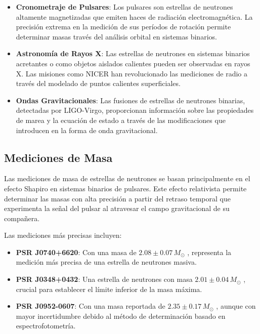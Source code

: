 \begin{itemize}
	\item \textbf{Cronometraje de Pulsares}: Los pulsares son estrellas de neutrones altamente magnetizadas que emiten haces de radiación electromagnética. La precisión extrema en la medición de sus períodos de rotación permite determinar masas través del análisis orbital en sistemas binarios.
	
	\item \textbf{Astronomía de Rayos X}: Las estrellas de neutrones en sistemas binarios acretantes o como objetos aislados calientes pueden ser observadas en rayos X. Las misiones como NICER han revolucionado las mediciones de radio a través del modelado de puntos calientes superficiales.
	
	\item \textbf{Ondas Gravitacionales}: Las fusiones de estrellas de neutrones binarias, detectadas por LIGO-Virgo, proporcionan información sobre las propiedades de marea y la ecuación de estado a través de las modificaciones que introducen en la forma de onda gravitacional.
\end{itemize}

\subsection{Mediciones de Masa}

Las mediciones de masa de estrellas de neutrones se basan principalmente en el efecto Shapiro en sistemas binarios de pulsares. Este efecto relativista permite determinar las masas con alta precisión a partir del retraso temporal que experimenta la señal del pulsar al atravesar el campo gravitacional de su compañera.

Las mediciones más precisas incluyen:

\begin{itemize}
	\item \textbf{PSR J0740+6620}: Con una masa de $2.08 \pm 0.07 \, M_\odot$ \cite{fonsecaRefinedMassGeometric2021}, representa la medición más precisa de una estrella de neutrones masiva.
	
	\item \textbf{PSR J0348+0432}: Una estrella de neutrones con masa $2.01 \pm 0.04 \, M_\odot$ \cite{antoniadisMassivePulsarCompact2013}, crucial para establecer el límite inferior de la masa máxima.
	
	\item \textbf{PSR J0952-0607}: Con una masa reportada de $2.35 \pm 0.17 \, M_\odot$ \cite{romaniPSRJ09520607Fastest2022}, aunque con mayor incertidumbre debido al método de determinación basado en espectrofotometría.
\end{itemize}

